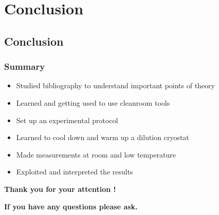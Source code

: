 \documentclass[handout]{beamer}
\begin{document}
    \section{Conclusion}
    \subsection*{Conclusion}
    \begin{frame}
           \frametitle{Summary}
          \begin{itemize}
               \item Studied bibliography to understand important points of theory
               \item Learned and getting used to use cleanroom tools
               \item Set up an experimental protocol
               \item Learned to cool down and warm up a dilution cryostat
               \item Made measurements at room and low temperature
               \item Exploited and interpreted the results 
           \end{itemize}
           
    \end{frame}
    \begin{frame}
        \begin{LARGE}
        
        \centering    
        \textbf{Thank you for your attention !}
        \vspace{0.5cm}
        
        \textbf{If you have any questions please ask.}
        
        \end{LARGE}

       \end{frame}
       
      
    
\end{document}
